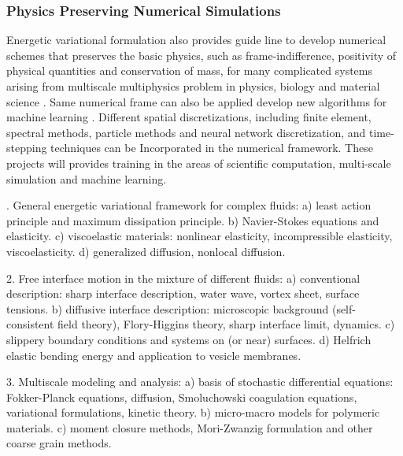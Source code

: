 \documentclass[11pt]{NSFamsart}
\begin{document}
\subsubsection*{Physics Preserving Numerical Simulations}
Energetic variational formulation also provides guide line to develop numerical schemes that preserves the basic physics, such as frame-indifference, positivity of physical quantities  and conservation of mass, for many complicated systems arising from multiscale multiphysics problem in physics, biology and material science \cite{liu2020variational, liu2020lagrangian, liu2020structure}. Same numerical frame can also be applied develop new algorithms for machine learning \cite{wang2020particle}. Different spatial discretizations, including finite element, spectral methods, particle methods and neural network discretization, and time-stepping techniques can be Incorporated in the numerical framework. These projects will provides training in the areas of scientific computation, multi-scale simulation and machine learning.



. General energetic variational framework for complex fluids: 
      a) least action principle and maximum dissipation principle. 
      b) Navier-Stokes equations and elasticity. 
      c) viscoelastic materials: nonlinear elasticity, incompressible elasticity, viscoelasticity. 
      d) generalized diffusion, nonlocal diffusion.

2. Free interface motion in the mixture of different fluids: 
     a) conventional description: sharp interface description, water wave, vortex sheet, surface tensions. 
     b) diffusive interface description: microscopic background (self-consistent field theory), Flory-Higgins theory, 
         sharp interface limit, dynamics. 
     c) slippery boundary conditions and systems on (or near) surfaces. 
     d) Helfrich elastic bending energy and application to vesicle membranes. 

3. Multiscale modeling and analysis: 
     a) basis of stochastic differential equations: Fokker-Planck equations, diffusion, 
         Smoluchowski coagulation equations, variational formulations, kinetic theory. 
     b) micro-macro models for polymeric materials. 
     c) moment closure methods, Mori-Zwanzig formulation and other coarse grain methods. 
\end{document}
